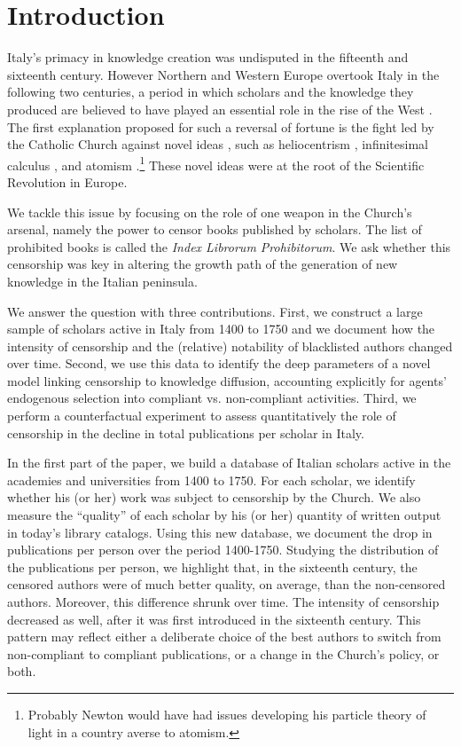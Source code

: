 \section{Introduction}
Italy's primacy in knowledge creation was undisputed in the fifteenth and sixteenth century. However Northern and Western Europe overtook Italy in the following two centuries, a period in which scholars and the knowledge they produced are believed to have played an essential role in the rise of the West \cite{mokyr2016}. The first explanation proposed for such a reversal of fortune is the fight led by the Catholic Church against novel ideas \cite{land99}, such as heliocentrism \cite{gingerich1973copernicus}, infinitesimal calculus \cite{alexander2014infinitesimal}, and atomism \cite{beretta2007}.\footnote{Probably Newton would have had issues developing his particle theory of light in a country averse to atomism.} These novel ideas were at the root of the Scientific Revolution in Europe.

We tackle this issue by focusing on the role of one weapon in the Church's arsenal, namely the power to censor books published by scholars. The list of prohibited books is called the \textit{Index Librorum Prohibitorum}. We ask whether this censorship was key in altering the growth path of the generation of new knowledge in the Italian peninsula.

We answer the question with three contributions. First, we construct a large sample of scholars active in Italy from 1400 to 1750 and we document how the intensity of censorship and the (relative) notability of blacklisted authors changed over time. Second, we use this data to identify the deep parameters of a novel model linking censorship to knowledge diffusion, accounting explicitly for agents' endogenous selection into compliant vs. non-compliant activities. Third, we perform a counterfactual experiment to assess quantitatively the role of censorship in the decline in total publications per scholar in Italy.

In the first part of the paper, we build a database of Italian scholars active in the academies and universities from 1400 to 1750. For each scholar, we identify whether his (or her) work was subject to censorship by the Church. We also measure the ``quality'' of each scholar by his (or her) quantity of written output in today's library catalogs. Using this new database, we document the drop in publications per person over the period 1400-1750. Studying the distribution of the publications per person, we highlight that, in the sixteenth century, the censored authors were of much better quality, on average, than the non-censored authors. Moreover, this difference shrunk over time. The intensity of censorship decreased as well, after it was first introduced in the sixteenth century. This pattern may reflect either a deliberate choice of the best authors to switch from non-compliant to compliant publications, or a change in the Church's policy, or both.

